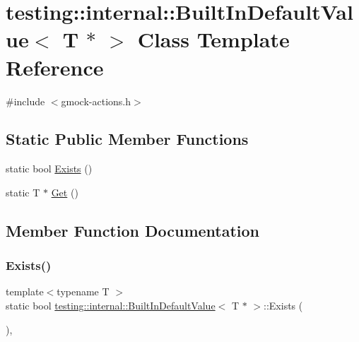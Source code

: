\hypertarget{classtesting_1_1internal_1_1BuiltInDefaultValue_3_01T_01_5_01_4}{}\section{testing\+::internal\+::Built\+In\+Default\+Value$<$ T $\ast$ $>$ Class Template Reference}
\label{classtesting_1_1internal_1_1BuiltInDefaultValue_3_01T_01_5_01_4}


{\ttfamily \#include $<$gmock-\/actions.\+h$>$}

\subsection*{Static Public Member Functions}
\begin{DoxyCompactItemize}
\item 
static bool \mbox{\hyperlink{classtesting_1_1internal_1_1BuiltInDefaultValue_3_01T_01_5_01_4_aafa7172f63d068305fb37d5db40bb543}{Exists}} ()
\item 
static T $\ast$ \mbox{\hyperlink{classtesting_1_1internal_1_1BuiltInDefaultValue_3_01T_01_5_01_4_adc2fa2bdae767589d171ae3a117e3a9f}{Get}} ()
\end{DoxyCompactItemize}


\subsection{Member Function Documentation}
\mbox{\label{classtesting_1_1internal_1_1BuiltInDefaultValue_3_01T_01_5_01_4_aafa7172f63d068305fb37d5db40bb543}} 
\subsubsection{\texorpdfstring{Exists()}{Exists()}}
{\footnotesize\ttfamily template$<$typename T $>$ \\
static bool \mbox{\hyperlink{classtesting_1_1internal_1_1BuiltInDefaultValue}{testing\+::internal\+::\+Built\+In\+Default\+Value}}$<$ T $\ast$ $>$\+::Exists (\begin{DoxyParamCaption}{ }\end{DoxyParamCaption})\hspace{0.3cm}{\ttfamily [inline]}, {\ttfamily [static]}}

